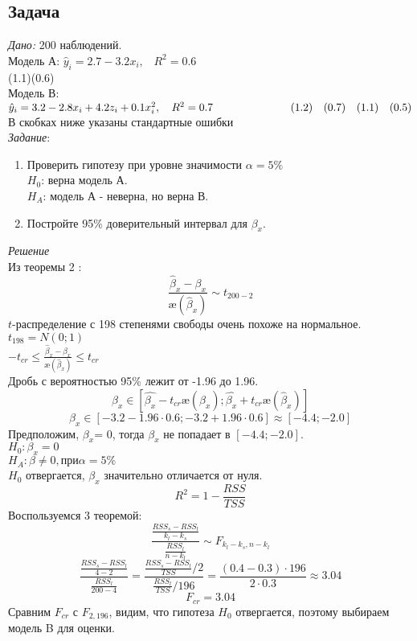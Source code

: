 \documentclass[12pt]{article} %
\theoremstyle{definition} %
\begin{document}
\subsection{Задача}
\textit{Дано:} 200 наблюдений.\\
Модель А: $\hat{y}_i=2.7 - 3.2x_i, \hspace{10pt} R^2=0.6$\\
\indent \hspace{2cm} (1.1)\hspace{10pt}(0.6) \\
Модель В: $\hat{y}_i=3.2 - 2.8x_i + 4.2z_i + 0.1x_i^2, \hspace{10pt} R^2=0.7\\
\indent \hspace{2cm}  (1.2) \hspace{10pt} (0.7) \hspace{10pt} (1.1)  \hspace{10pt}  (0.5)$\\
В скобках ниже указаны стандартные ошибки\\
\indent \textit{Задание}:
\begin{enumerate}
    \item Проверить гипотезу при уровне значимости $\alpha = 5\% $  \\
$H_0$: верна модель А.\\
$H_A$: модель А - неверна, но верна В.
\item Постройте 95\% доверительный интервал для $\beta_x.$
\end{enumerate}
\textit{Решение}\\Из теоремы 2 :\\
\[ \frac{\hat{\beta}_x-\beta_x}{\text{\ae}(\hat{\beta}_x)}\sim t_{200-2}\]
$t$-распределение с 198 степенями свободы очень похоже на нормальное.\\
$t_{198} = N(0;1)$\\
$-t_{cr} \leq \frac{\hat{\beta}_x-\beta_x}{\text{\ae}(\hat{\beta}_x)} \leq t_{cr} $\\
Дробь с вероятностью 95\% лежит от -1.96 до 1.96.\\
\[
\beta_x \in [\hat{\beta_x} - t_{cr} \text{\ae}(\hat{\beta}_x); \hat{\beta_x} + t_{cr} \text{\ae}(\hat{\beta}_x)]
\]
\[
\beta_x \in [-3.2 - 1.96\cdot0.6; -3.2 + 1.96\cdot0.6] \approx [-4.4;-2.0]
\]
Предположим, $\beta_x$= 0, тогда $\beta_x$ не попадает в $[-4.4;-2.0]$.\\
$H_0:\beta_x=0$\\
$H_A:\beta \neq 0, при \alpha=5\%$\\
$H_0$ отвергается, $\beta_x$ значительно отличается от нуля.
\[
R^2=1-\frac{RSS}{TSS}
\]
Воспользуемся 3 теоремой:
\[ \frac{\frac{{RSS}_s-RSS_l}{k_l-k_s}}  {\frac{RSS_l}{n-k_l}} \sim F_{k_l-k_s,n-k_l}
\]
\[
\frac{\frac{{RSS}_s-RSS_l}{4-2}}  {\frac{RSS_l}{200-4}}=\frac{\frac{{RSS}_s-RSS_l}{TSS}/2}  {\frac{RSS_l}{TSS}/196}=
\frac{(0.4-0.3)\cdot196}{2\cdot0.3} \approx 3.04
\]
\[
F_{cr} = 3.04
\]
Сравним $F_{cr}$ с $F_{2,196}$, видим, что гипотеза $H_0$ отвергается, поэтому выбираем модель B для оценки.
\end{document}
